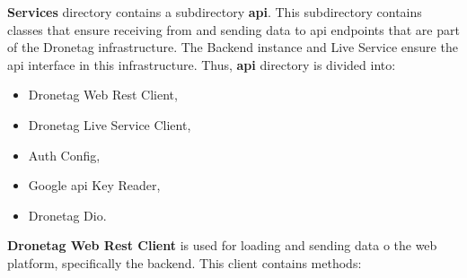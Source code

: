 \textbf{Services} directory contains a subdirectory \textbf{api}.
This subdirectory contains classes that ensure receiving from and sending data to \acrshort{api} endpoints that are part of the Dronetag infrastructure.
The Backend instance and Live Service ensure the \acrshort{api} interface in this infrastructure.
Thus, \textbf{api} directory is divided into:
\begin{itemize}
    \item Dronetag Web Rest Client,
    \item Dronetag Live Service Client,
    \item Auth Config,
    \item Google \acrshort{api} Key Reader,
    \item Dronetag Dio.
\end{itemize}
\newpage
\textbf{Dronetag Web Rest Client} is used for loading and sending data o the web platform, specifically the backend.
This client contains methods:
